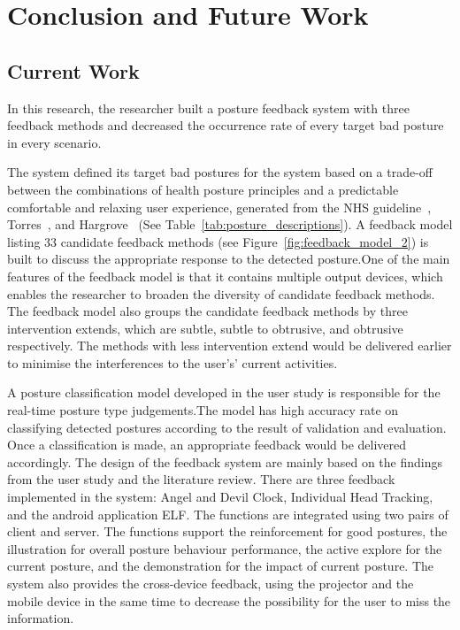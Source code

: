 \chapter{Conclusion and Future Work}

\section{Current Work}
In this research, the researcher built a posture feedback system with three feedback methods and decreased the occurrence rate of every target bad posture in every scenario.

The system defined its target bad postures for the system based on a trade-off between the combinations of health posture principles and a predictable comfortable and relaxing user experience, generated from the NHS guideline~\cite{nhs_sit_correctly}, Torres~\cite{best_viewing_distance_tv}, and Hargrove~\cite{bad_posture_back_pain} (See Table~\ref{tab:posture_descriptions}). A feedback model listing 33 candidate feedback methods (see Figure~\ref{fig:feedback_model_2}) is built to discuss the appropriate response to the detected posture.One of the main features of the feedback model is that it contains multiple output devices, which enables the researcher to broaden the diversity of candidate feedback methods. The feedback model also groups the candidate feedback methods by three intervention extends, which are subtle, subtle to obtrusive, and obtrusive respectively. The methods with less intervention extend would be delivered earlier to minimise the interferences to the user's’ current activities.

A posture classification model developed in the user study is responsible for the real-time posture type judgements.The model has high accuracy rate on classifying detected postures according to the result of validation and evaluation. Once a classification is made, an appropriate feedback would be delivered accordingly. The design of the feedback system are mainly based on the findings from the user study and the literature review. There are three feedback implemented in the system: Angel and Devil Clock, Individual Head Tracking, and the android application ELF. The functions are integrated using two pairs of client and server. The functions support the reinforcement for good postures, the illustration for overall posture behaviour performance, the active explore for the current posture, and the demonstration for the impact of current posture. The system also provides the cross-device feedback, using the projector and the mobile device in the same time to decrease the possibility for the user to miss the information.

